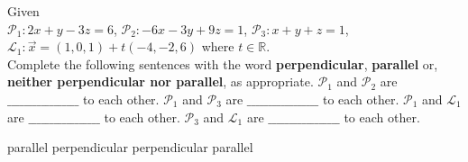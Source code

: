 
\begin{Exercise}[
name={},
title={}, 
difficulty=0,
origin={\cite{YL}}]
Given\\
$\mathcal{P}_1: 2x+y-3z=6$,\;
$\mathcal{P}_2: -6x-3y+9z=1$,\;
$\mathcal{P}_3: x+y+z=1$,\\
$\mathcal{L}_1: \vec{x}=(1,0,1)+t(-4,-2,6)$ where $t\in\mathbb{R}$.\\
Complete the following sentences with the word \textbf{perpendicular}, \textbf{parallel} or, \textbf{neither perpendicular nor parallel}, as appropriate.
\Question $\mathcal{P}_1$ and $\mathcal{P}_2$ are  $\_\_\_\_\_\_\_\_\_\_\_\_\_\_\_\_\_$ to each other.
\Question $\mathcal{P}_1$ and $\mathcal{P}_3$ are  $\_\_\_\_\_\_\_\_\_\_\_\_\_\_\_\_\_$ to each other.
\Question $\mathcal{P}_1$ and $\mathcal{L}_1$ are  $\_\_\_\_\_\_\_\_\_\_\_\_\_\_\_\_\_$ to each other.
\Question $\mathcal{P}_3$ and $\mathcal{L}_1$ are  $\_\_\_\_\_\_\_\_\_\_\_\_\_\_\_\_\_$ to each other.
\end{Exercise}

\begin{Answer}
\begin{multicols}{2}
\Question parallel
\Question perpendicular
\Question perpendicular
\Question parallel
\EndCurrentQuestion
\end{multicols}
\end{Answer}
